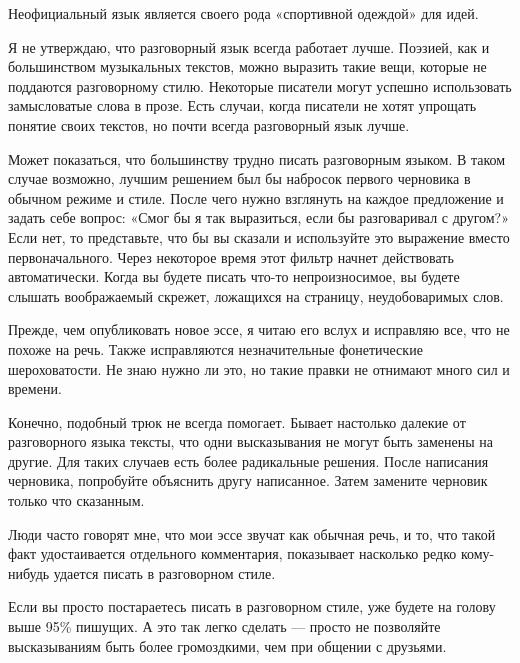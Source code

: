 \documentclass[ebook,12pt,oneside,openany]{memoir}
\begin{document}
Неофициальный язык является своего рода «спортивной одеждой» для идей.

Я не утверждаю, что разговорный язык всегда работает лучше. Поэзией,
как и большинством музыкальных текстов, можно выразить такие вещи,
которые не поддаются разговорному стилю. Некоторые писатели могут
успешно использовать замысловатые слова в прозе. Есть случаи, когда
писатели не хотят упрощать понятие своих текстов, но почти всегда
разговорный язык лучше.

Может показаться, что большинству трудно писать разговорным языком. В
таком случае возможно, лучшим решением был бы набросок первого
черновика в обычном режиме и стиле. После чего нужно взглянуть на
каждое предложение и задать себе вопрос: «Смог бы я так выразиться,
если бы разговаривал с другом?» Если нет, то представьте, что бы вы
сказали и используйте это выражение вместо первоначального. Через
некоторое время этот фильтр начнет действовать автоматически. Когда вы
будете писать что-то непроизносимое, вы будете слышать воображаемый
скрежет, ложащихся на страницу, неудобоваримых слов.

Прежде, чем опубликовать новое эссе, я читаю его вслух и исправляю
все, что не похоже на речь. Также исправляются незначительные
фонетические шероховатости. Не знаю нужно ли это, но такие правки не
отнимают много сил и времени.

Конечно, подобный трюк не всегда помогает. Бывает настолько далекие от
разговорного языка тексты, что одни высказывания не могут быть
заменены на другие. Для таких случаев есть более радикальные решения.
После написания черновика, попробуйте объяснить другу написанное.
Затем замените черновик только что сказанным.

Люди часто говорят мне, что мои эссе звучат как обычная речь, и то,
что такой факт удостаивается отдельного комментария, показывает
насколько редко кому-нибудь удается писать в разговорном стиле.

Если вы просто постараетесь писать в разговорном стиле, уже будете на
голову выше 95\% пишущих. А это так легко сделать — просто не
позволяйте высказываниям быть более громоздкими, чем при общении с
друзьями.
\end{document}
